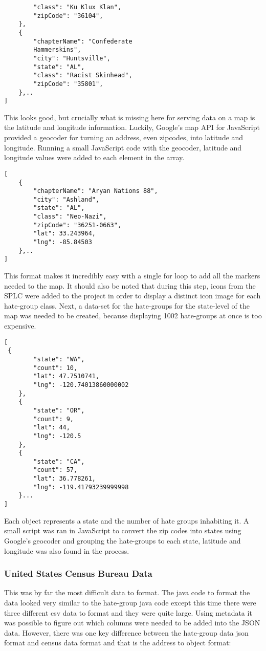 \documentclass[twoside]{article}
\begin{document}
\begin{multicols}{2}
\begin{verbatim}
        "class": "Ku Klux Klan",
        "zipCode": "36104",
    },
    {
        "chapterName": "Confederate 
        Hammerskins",
        "city": "Huntsville",
        "state": "AL",
        "class": "Racist Skinhead",
        "zipCode": "35801",
    },..
]
\end{verbatim}
This looks good, but crucially what is missing here for serving data on a map is the latitude and longitude information. Luckily, Google’s map API for JavaScript provided a geocoder for turning an address, even zipcodes, into latitude and longitude. Running a small JavaScript code with the geocoder, latitude and longitude values were added to each element in the array.
\begin{verbatim}
[
    {
        "chapterName": "Aryan Nations 88",
        "city": "Ashland",
        "state": "AL",
        "class": "Neo-Nazi",
        "zipCode": "36251-0663",
        "lat": 33.243964,
        "lng": -85.84503
    },..
]
\end{verbatim}

This format makes it incredibly easy with a single for loop to add all the markers needed to the map. It should also be noted that during this step, icons from the SPLC were added to the project in order to display a distinct icon image for each hate-group class. Next, a data-set for the hate-groups for the state-level of the map was needed to be created, because displaying 1002 hate-groups at once is too expensive.

\begin{verbatim}
[ 
 {
        "state": "WA",
        "count": 10,
        "lat": 47.7510741,
        "lng": -120.74013860000002
    },
    {
        "state": "OR",
        "count": 9,
        "lat": 44,
        "lng": -120.5
    },
    {
        "state": "CA",
        "count": 57,
        "lat": 36.778261,
        "lng": -119.41793239999998
    }...
]
\end{verbatim}
Each object represents a state and the number of hate groups inhabiting it. A small script was ran in JavaScript to convert the zip codes into states using  Google’s geocoder and grouping the hate-groups to each state, latitude and longitude was also found in the process.

\subsubsection{United States Census Bureau Data}

This was by far the most difficult data to format. The java code to format the data looked very similar to the hate-group java code except this time 
there were three different csv data to format and they were quite large. Using metadata it was possible to figure out which columns were needed to be added into the JSON data. However, there was one key difference between the hate-group data json format and census data format and that is the address to object format:
\begin{verbatim}


\end{verbatim}
\end{multicols}
\end{document}
